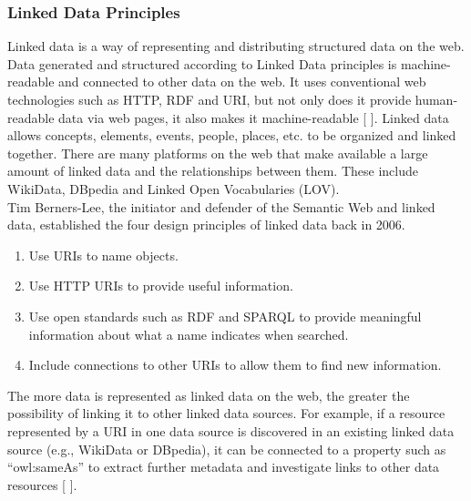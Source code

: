     \subsubsection{Linked Data Principles}
    Linked data is a way of representing and distributing structured data on the web. Data generated and structured according to Linked Data principles is machine-readable and connected to other data on the web. It uses conventional web technologies such as HTTP, RDF and URI, but not only does it provide human-readable data via web pages, it also makes it machine-readable [ ]. Linked data allows concepts, elements, events, people, places, etc. to be organized and linked together. There are many platforms on the web that make available a large amount of linked data and the relationships between them. These include WikiData, DBpedia and Linked Open Vocabularies (LOV).\\

    Tim Berners-Lee, the initiator and defender of the Semantic Web and linked data, established the four design principles of linked data back in 2006.
    \begin{enumerate}
        \item Use URIs to name objects.
        \item Use HTTP URIs to provide useful information. 
        \item Use open standards such as RDF and SPARQL to provide meaningful information about what a name indicates when searched. 
        \item Include connections to other URIs to allow them to find new information. 
    \end{enumerate}

    The more data is represented as linked data on the web, the greater the possibility of linking it to other linked data sources. For example, if a resource represented by a URI in one data source is discovered in an existing linked data source (e.g., WikiData or DBpedia), it can be connected to a property such as “owl:sameAs” to extract further metadata and investigate links to other data resources [ ].\\

